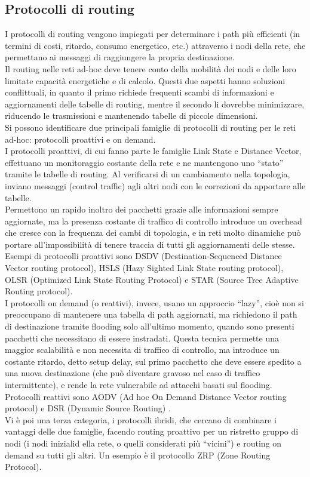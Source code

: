 \subsection[Protocolli di routing]{Protocolli di routing}
I protocolli di routing vengono impiegati per determinare i path più efficienti (in termini di costi, ritardo, consumo energetico, etc.) attraverso i nodi della rete, che permettano ai messaggi di raggiungere la propria destinazione. \\
Il routing nelle reti ad-hoc deve tenere conto della mobilità dei nodi e delle loro limitate capacità energetiche e di calcolo. 
Questi due aspetti hanno soluzioni conflittuali, in quanto il primo richiede frequenti scambi di informazioni e aggiornamenti delle tabelle di routing, mentre il secondo li dovrebbe minimizzare, riducendo le trasmissioni e mantenendo tabelle di piccole dimensioni. \\
Si possono identificare due principali famiglie di protocolli di routing per le reti ad-hoc: protocolli proattivi e on demand.\\
I protocolli proattivi, di cui fanno parte le famiglie Link State e Distance Vector, effettuano un monitoraggio costante della rete e ne mantengono uno “stato” tramite le tabelle di routing. 
Al verificarsi di un cambiamento nella topologia, inviano messaggi (control traffic) agli altri nodi con le correzioni da apportare alle tabelle.\\ Permettono un rapido inoltro dei pacchetti grazie alle informazioni sempre aggiornate, ma la presenza costante di traffico di controllo introduce un overhead che cresce con la frequenza dei cambi di topologia, e in reti molto dinamiche può portare all'impossibilità di tenere traccia di tutti gli aggiornamenti delle stesse. Esempi di protocolli proattivi sono DSDV (Destination-Sequenced Distance Vector routing protocol), HSLS (Hazy Sighted Link State routing protocol), OLSR (Optimized Link State Routing Protocol) e STAR (Source Tree Adaptive Routing protocol).\\
I protocolli on demand (o reattivi), invece, usano un approccio “lazy”, cioè non si preoccupano di mantenere una tabella di path aggiornati, ma richiedono il path di destinazione tramite flooding solo all'ultimo momento, quando sono presenti pacchetti che necessitano di essere instradati.
Questa tecnica permette una maggior scalabilità e non necessita di traffico di controllo, ma introduce un costante ritardo, detto setup delay, sul primo pacchetto che deve essere spedito a una nuova destinazione (che può diventare gravoso nel caso di traffico intermittente), e rende la rete vulnerabile ad attacchi basati sul flooding. Protocolli reattivi sono AODV (Ad hoc On Demand Distance Vector routing protocol) e DSR (Dynamic Source Routing) \cite{879383}. \\
Vi è poi una terza categoria, i protocolli ibridi, che cercano di combinare i vantaggi delle due famiglie, facendo routing proattivo per un ristretto gruppo di nodi (i nodi inizialid ella rete, o quelli considerati più “vicini”) e routing on demand su tutti gli altri. Un esempio è il protocollo ZRP (Zone Routing Protocol).\\

